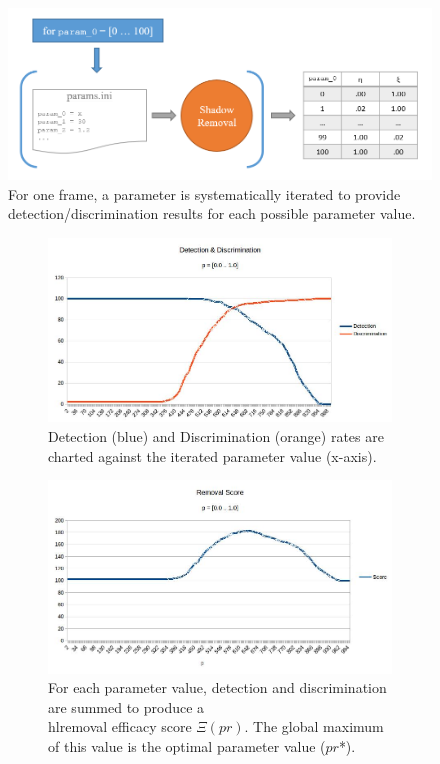 \begin{figure}
  \centering
  \includegraphics[width=1\linewidth]{figures/gui_iterate.png}
  \caption{For one frame, a parameter is systematically iterated to provide detection/discrimination results for each possible parameter value.}
  \label{fig:guiiterate}
\end{figure}

\begin{figure}
  \centering
  \begin{subfigure}{1\linewidth}
  	\includegraphics[width=1\linewidth]{figures/campus_dd.jpg}
  \caption{Detection (blue) and Discrimination (orange) rates are charted against the iterated parameter value (x-axis).}
  \end{subfigure}
  \hfill
  \begin{subfigure}{1\linewidth}
  	\includegraphics[width=1\linewidth]{figures/campus_score.jpg}
  \caption{For each parameter value, detection and discrimination are summed to produce a \\hl{removal efficacy} score $\Xi(pr)$. The global maximum of this value is the optimal parameter value ($pr$*).}
  \end{subfigure}
\caption{}
\label{fig:campusddscore}
\end{figure}

